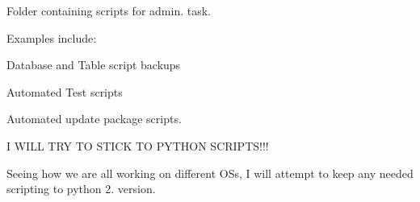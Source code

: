 Folder containing scripts for admin. task.

Examples include\-:


\begin{DoxyEnumerate}
\item Database and Table script backups
\item Automated Test scripts
\item Automated update package scripts.
\end{DoxyEnumerate}

I W\-I\-L\-L T\-R\-Y T\-O S\-T\-I\-C\-K T\-O P\-Y\-T\-H\-O\-N S\-C\-R\-I\-P\-T\-S!!!

Seeing how we are all working on different O\-Ss, I will attempt to keep any needed scripting to python 2. version. 